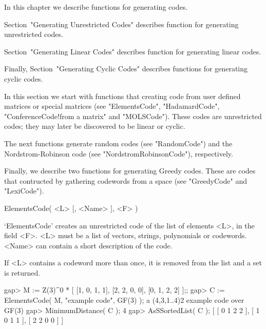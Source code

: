 %
%
%
%
%

In this chapter we describe functions for generating codes.

Section~"Generating Unrestricted Codes" describes function for generating
unrestricted codes.

Section~"Generating  Linear  Codes" describes function for generating linear
codes.

Finally,  Section~"Generating  Cyclic  Codes"  describes  functions   for
generating cyclic codes.


In this section we start with functions  that  creating  code  from  user
defined matrices or special matrices (see "ElementsCode", "HadamardCode",
"ConferenceCode!from  a  matrix"  and  "MOLSCode").   These   codes   are
unrestricted codes; they may later be discovered to be linear or cyclic.

The next functions generate  random  codes  (see  "RandomCode")  and  the
Nordstrom-Robinson code (see "NordstromRobinsonCode"), respectively.

Finally, we describe two functions for generating Greedy codes. These are
codes  that  contructed  by  gathering  codewords  from  a   space   (see
"GreedyCode" and "LexiCode").

\>ElementsCode( <L> [, <Name> ], <F> )

`ElementsCode' creates an unrestricted code of the  list of elements <L>,
in the field <F>.  <L> must be a list of vectors, strings, polynomials or
codewords. <Name> can contain a short description of the code.

If <L>  contains a codeword more than  once, it is  removed from the list
and a {\GAP} set is returned.

\beginexample
gap> M := Z(3)^0 * [ [1, 0, 1, 1], [2, 2, 0, 0], [0, 1, 2, 2] ];;
gap> C := ElementsCode( M, "example code", GF(3) );
a (4,3,1..4)2 example code over GF(3)
gap> MinimumDistance( C );
4
gap> AsSSortedList( C );
[ [ 0 1 2 2 ], [ 1 0 1 1 ], [ 2 2 0 0 ] ]
\endexample

